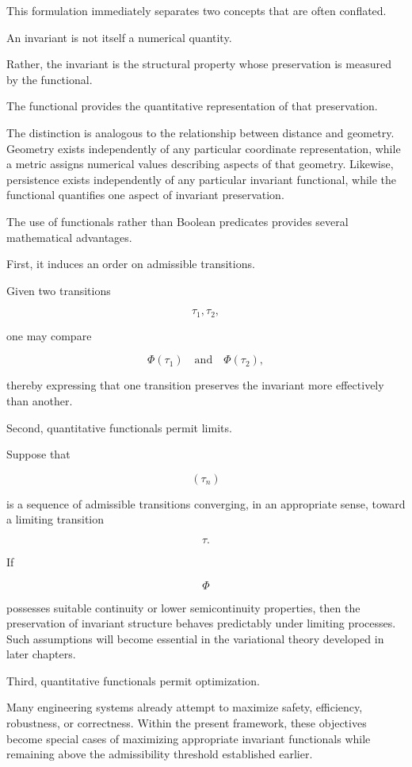 \documentclass[11pt]{book}
\numberwithin{equation}{chapter}
\theoremstyle{definition}
\theoremstyle{plain}
\begin{document}
This formulation immediately separates two concepts that are often conflated.

An invariant is not itself a numerical quantity.

Rather, the invariant is the structural property whose preservation is measured by the functional.

The functional provides the quantitative representation of that preservation.

The distinction is analogous to the relationship between distance and geometry. Geometry exists independently of any particular coordinate representation, while a metric assigns numerical values describing aspects of that geometry. Likewise, persistence exists independently of any particular invariant functional, while the functional quantifies one aspect of invariant preservation.

The use of functionals rather than Boolean predicates provides several mathematical advantages.

First, it induces an order on admissible transitions.

Given two transitions

\[
\tau_1,\tau_2,
\]

one may compare

\[
\Phi(\tau_1)
\quad\text{and}\quad
\Phi(\tau_2),
\]

thereby expressing that one transition preserves the invariant more effectively than another.

Second, quantitative functionals permit limits.

Suppose that

\[
(\tau_n)
\]

is a sequence of admissible transitions converging, in an appropriate sense, toward a limiting transition

\[
\tau.
\]

If

\[
\Phi
\]

possesses suitable continuity or lower semicontinuity properties, then the preservation of invariant structure behaves predictably under limiting processes. Such assumptions will become essential in the variational theory developed in later chapters.

Third, quantitative functionals permit optimization.

Many engineering systems already attempt to maximize safety, efficiency, robustness, or correctness. Within the present framework, these objectives become special cases of maximizing appropriate invariant functionals while remaining above the admissibility threshold established earlier.
\end{document}
